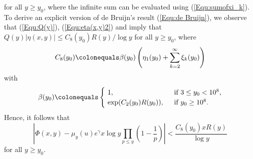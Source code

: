 \documentclass[12pt,reqno]{amsart}
\begin{document}
for all $y\ge y_0$, where the infinite sum can be evaluated using (\ref{Equ:sumofxi_k}). To derive an explicit version of de Bruijn's result (\ref*{Equ:de Bruijn}), we observe that (\ref{Equ:Q(y)}), (\ref{Equ:eta(x,y)2}) and \cite[Theorem 23]{RS} imply that $Q(y)|\eta(x,y)|\le C_8(y_0)R(y)/\log y$ for all $y\ge y_0$, where
\[C_8(y_0)\colonequals\beta(y_0)\left(\eta_1(y_0)+\sum_{k=2}^{\infty}\xi_{k}(y_0)\right)\]
with
\[\beta(y_0)\colonequals\begin{cases}
~1,& \text{\hspace*{2mm}if~}3\le y_0<10^8,\\
~\exp(C_2(y_0)R(y_0)),&\text{\hspace*{2mm}if~}y_0\ge10^8.
\end{cases}\]
Hence, it follows that
\begin{equation}\label{Equ:ExplicitdeBruijn}
\left|\Phi(x,y)-\mu_y(u)e^{\gamma}x\log y\prod_{p\leq y}\left(1-\frac{1}{p}\right)\right|< \frac{C_8(y_0)xR(y)}{\log y}
\end{equation}
for all $y\ge y_0$. 
\end{document}
